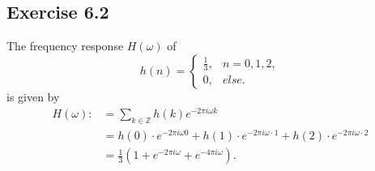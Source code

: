 \documentclass[12pt]{article}
\begin{document}
\begin{itemize}
\section*{Exercise 6.2}
The frequency response $H(\omega)$ of
\[ h(n) = \begin{cases}
            \frac{1}{3}, &n=0,1,2,\\
            0, &else.
          \end{cases} \]
is given by
\begin{align*}
    H(\omega):&=\sum_{k\in\mathbb{Z}}h(k)e^{-2\pi i \omega k}\\
    &=h(0)\cdot e^{-2\pi i \omega 0} + h(1)\cdot e^{-2\pi i \omega\cdot 1} + h(2)\cdot e^{-2\pi i \omega \cdot 2}\\
    &=\frac{1}{3}\left(1+e^{-2\pi i \omega}+e^{-4\pi i \omega}\right).
\end{align*}
    
\end{itemize}
\end{document}

